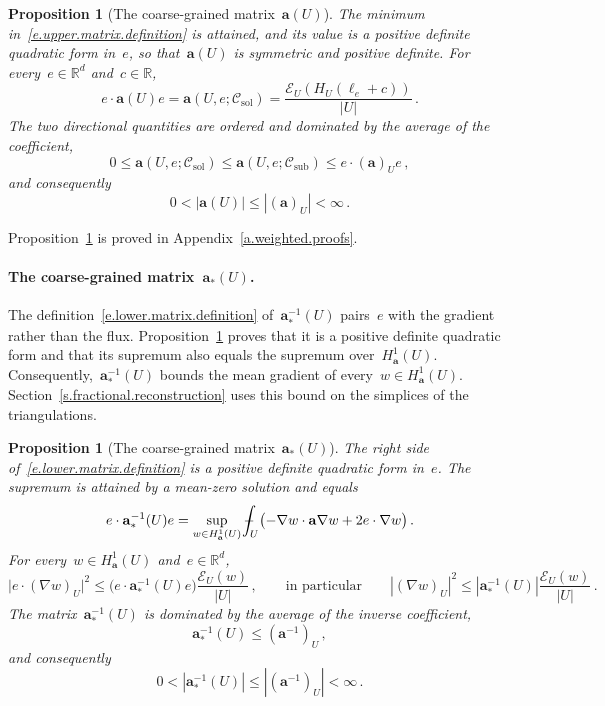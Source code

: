 \documentclass[11pt,letterpaper]{article}
\numberwithin{equation}{section}
\newtheorem{proposition}[theorem]{Proposition}
\theoremstyle{definition}
\newcommand{\R}{\mathbb{R}}
\newcommand{\Rd}{\mathbb{R}^d}
\renewcommand{\a}{\mathbf{a}}
\newcommand{\Ener}{\mathcal E}
\newcommand{\Csol}{\mathcal C_{\mathrm{sol}}}
\newcommand{\Csub}{\mathcal C_{\mathrm{sub}}}
\def\Xint#1{\mathchoice
	{\XXint\displaystyle\textstyle{#1}}%
	{\XXint\textstyle\scriptstyle{#1}}%
	{\XXint\scriptstyle\scriptscriptstyle{#1}}%
	{\XXint\scriptscriptstyle\scriptscriptstyle{#1}}%
	\!\int}
\def\XXint#1#2#3{{\setbox0=\hbox{$#1{#2#3}{\int}$}
		\vcenter{\hbox{$#2#3$}}\kern-.5\wd0}}
\def\fint{\Xint-}
\begin{document}
\begin{proposition}[The coarse-grained matrix~$\a(U)$]
\label{p.upper.dirichlet}
The minimum in~\eqref{e.upper.matrix.definition} is attained, and its value is a positive definite quadratic form in~$e$, so that~$\a(U)$ is symmetric and positive definite. For every~$e\in\Rd$ and~$c\in\R$,
\begin{equation}
	e\cdot\a(U)e=\a(U,e;\Csol)=\frac{\Ener_U(H_U(\ell_e+c))}{|U|}\,.
	\label{e.upper.dirichlet}
\end{equation}
The two directional quantities are ordered and dominated by the average of the coefficient,
\begin{equation}
	0\leq\a(U,e;\Csol)\leq\a(U,e;\Csub)\leq e\cdot(\a)_Ue\,,
	\label{e.upper.coefficient.bound}
\end{equation}
and consequently
\begin{equation}
	0<|\a(U)|\leq|(\a)_U|<\infty\,.
	\label{e.upper.norm.bound}
\end{equation}
\end{proposition}

Proposition~\ref{p.upper.dirichlet} is proved in Appendix~\ref{a.weighted.proofs}.

\paragraph{The coarse-grained matrix~$\a_*(U)$.} The definition~\eqref{e.lower.matrix.definition} of~$\a_*^{-1}(U)$ pairs~$e$ with the gradient rather than the flux. Proposition~\ref{p.lower.matrix} proves that it is a positive definite quadratic form and that its supremum also equals the supremum over~$H^1_\a(U)$. Consequently,~$\a_*^{-1}(U)$ bounds the mean gradient of every~$w\in H^1_\a(U)$. Section~\ref{s.fractional.reconstruction} uses this bound on the simplices of the triangulations.

\begin{proposition}[The coarse-grained matrix~$\a_*(U)$]
\label{p.lower.matrix}
The right side of~\eqref{e.lower.matrix.definition} is a positive definite quadratic form in~$e$. The supremum is attained by a mean-zero solution and equals
\begin{equation}
	e\cdot\a_*^{-1}(U)e=\sup_{w\in H^1_\a(U)}\fint_U\bigl(-\nabla w\cdot\a\nabla w+2e\cdot\nabla w\bigr)\,.
	\label{e.lower.all.functions}
\end{equation}
For every~$w\in H^1_\a(U)$ and~$e\in\Rd$,
\begin{equation}
	\bigl|e\cdot(\nabla w)_U\bigr|^2\leq\bigl(e\cdot\a_*^{-1}(U)e\bigr)\frac{\Ener_U(w)}{|U|}\,,\qquad\mbox{in particular}\qquad |(\nabla w)_U|^2\leq|\a_*^{-1}(U)|\frac{\Ener_U(w)}{|U|}\,.
	\label{e.lower.mean.gradient}
\end{equation}
The matrix~$\a_*^{-1}(U)$ is dominated by the average of the inverse coefficient,
\begin{equation}
	\a_*^{-1}(U)\leq(\a^{-1})_U\,,
	\label{e.lower.coefficient.bound}
\end{equation}
and consequently
\begin{equation}
	0<|\a_*^{-1}(U)|\leq|(\a^{-1})_U|<\infty\,.
	\label{e.lower.norm.bound}
\end{equation}
\end{proposition}
\end{document}
